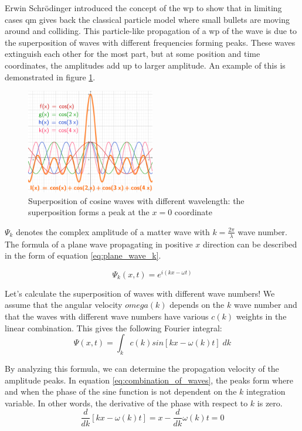 Erwin Schrödinger introduced the concept of the \acrfull{wp} to show that in limiting cases \acrshort{qm} gives back the classical particle model where small bullets are moving around and colliding.
This particle-like propagation of a \acrshort{wp} of the wave is due to the superposition of waves with different frequencies forming peaks.
These waves extinguish each other for the most part, but at some position and time coordinates, the amplitudes add up to larger amplitude.
An example of this is demonstrated in figure \ref{fig:superposition}.
\begin{figure}[hbt!]
	\centering
	\includegraphics[width=0.5\textwidth]{figures/Superposition of cosine waves.png}
	\caption{Superposition of cosine waves with different wavelength: the superposition forms a peak at the $x = 0$ coordinate}
	\label{fig:superposition}
\end{figure}

$\Psi_k$ denotes the complex amplitude of a matter wave with $k=\frac{2\pi}{\lambda}$ wave number. The formula of a plane wave propagating in positive $x$ direction can be described in the form of equation \ref{eq:plane_wave_k}.

\begin{equation}
	\label{eq:plane_wave_k}
	\Psi_k(x, t) = e^{i(kx - \omega t)}
\end{equation}

Let's calculate the superposition of waves with different wave numbers! We assume that the angular velocity $omega(k)$ depends on the $k$ wave number and that the waves with different wave numbers have various $c(k)$ weights in the linear combination. This gives the following Fourier integral:
\begin{equation}
	\label{eq:combination_of_waves}
	\Psi(x, t) = \int_k c(k) sin[kx - \omega(k)t]\; dk
\end{equation}

By analyzing this formula, we can determine the propagation velocity of the amplitude peaks.
In equation \ref{eq:combination_of_waves}, the peaks form where and when the phase of the sine function is not dependent on the $k$ integration variable. In other words, the derivative of the phase with respect to $k$ is zero.
\begin{equation}
	\label{eq:derivative_of_phase}
	\frac{d}{dk}[kx - \omega(k)t] = x - \frac{d}{dk}\omega(k)t = 0
\end{equation}

